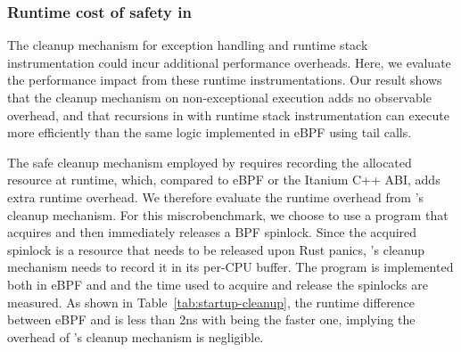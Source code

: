 \subsubsection{Runtime cost of safety in \projname{}}
The cleanup mechanism for exception handling and runtime stack instrumentation
    could incur additional performance overheads.
Here, we evaluate the performance impact from these runtime instrumentations.
Our result shows that the cleanup mechanism on non-exceptional execution adds
    no observable overhead, and that recursions in \projname{} with runtime
    stack instrumentation can execute more efficiently than the same logic
    implemented in eBPF using tail calls.

The safe cleanup mechanism employed by \projname{} requires recording the allocated
    resource at runtime, which, compared to eBPF or the Itanium C++ ABI, adds
    extra runtime overhead.
We therefore evaluate the runtime overhead from \projname{}'s cleanup
    mechanism.
For this miscrobenchmark, we choose to use a program that acquires and then
    immediately releases a BPF spinlock.
Since the acquired spinlock is a resource that needs to be released upon Rust
    panics, \projname{}'s cleanup mechanism needs to record it in its per-CPU
    buffer.
The program is implemented both in eBPF and \projname{} and the time used to
    acquire and release the spinlocks are measured.
As shown in Table~\ref{tab:startup-cleanup}, the runtime difference between
    eBPF and \projname{} is less than 2ns with \projname{} being the faster
    one, implying the overhead of \projname{}'s cleanup mechanism is
    negligible.

